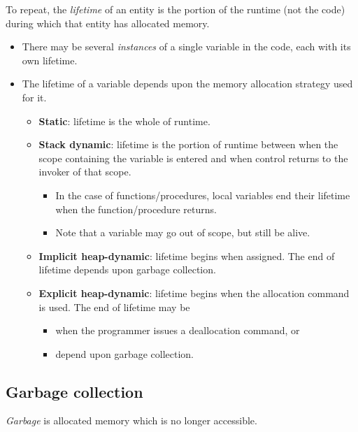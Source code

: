 \documentclass[11pt]{article}
\theoremstyle{definition}
\begin{document}
To repeat,
the \emph{lifetime} of an entity is the portion of the runtime
(not the code) during which that entity has allocated memory.
\begin{itemize}
\item There may be several \emph{instances} of a single variable in the code,
each with its own lifetime.
\item The lifetime of a variable depends upon the memory allocation
strategy used for it.
\begin{itemize}
\item \textbf{Static}: lifetime is the whole of runtime.
\item \textbf{Stack dynamic}: lifetime is the portion of runtime between
when the scope containing the variable is entered
and when control returns to the invoker of that scope.
\begin{itemize}
\item In the case of functions/procedures, local variables
end their lifetime when the function/procedure returns.
\item Note that a variable may go out of scope, but still be alive.
\end{itemize}
\item \textbf{Implicit heap-dynamic}: lifetime begins when assigned.
The end of lifetime depends upon garbage collection.
\item \textbf{Explicit heap-dynamic}: lifetime begins when the allocation
command is used. The end of lifetime may be
\begin{itemize}
\item when the programmer issues a deallocation command, or
\item depend upon garbage collection.
\end{itemize}
\end{itemize}
\end{itemize}

\subsection{Garbage collection}
\label{sec:org8d93afb}

\emph{Garbage} is allocated memory which is no longer accessible.
\end{document}
